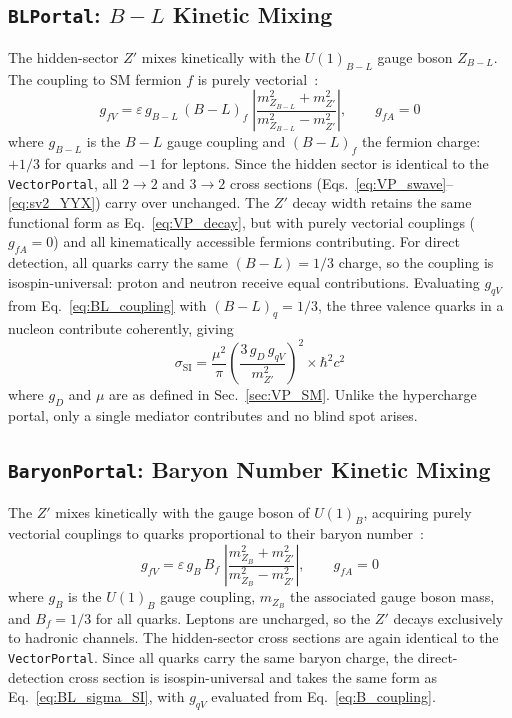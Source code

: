\documentclass[11pt]{article}
\numberwithin{equation}{section}
\newcommand{\epsX}{\varepsilon}
\begin{document}
\subsection{\texttt{BLPortal}: $B-L$ Kinetic Mixing}
\label{sec:BL}

The hidden-sector $Z'$ mixes kinetically with the $U(1)_{B-L}$ gauge boson $Z_{B-L}$. The coupling to SM fermion $f$ is purely vectorial~\cite{Hooper:2019xss}:
\begin{equation}
    g_{fV} = \epsX\,g_{B-L}\,(B-L)_f\;\left|\frac{m_{Z_{B-L}}^2 + m_{Z'}^2}{m_{Z_{B-L}}^2 - m_{Z'}^2}\right|, \qquad g_{fA} = 0
    \label{eq:BL_coupling}
\end{equation}
where $g_{B-L}$ is the $B-L$ gauge coupling and $(B-L)_f$ the fermion charge: $+1/3$ for quarks and $-1$ for leptons. Since the hidden sector is identical to the \texttt{VectorPortal}, all $2\to2$ and $3\to2$ cross sections (Eqs.~\eqref{eq:VP_swave}--\eqref{eq:sv2_YYX}) carry over unchanged. The $Z'$ decay width retains the same functional form as Eq.~\eqref{eq:VP_decay}, but with purely vectorial couplings ($g_{fA} = 0$) and all kinematically accessible fermions contributing. For direct detection, all quarks carry the same $(B-L) = 1/3$ charge, so the coupling is isospin-universal: proton and neutron receive equal contributions. Evaluating $g_{qV}$ from Eq.~\eqref{eq:BL_coupling} with $(B-L)_q = 1/3$, the three valence quarks in a nucleon contribute coherently, giving
\begin{equation}
    \sigma_{\text{SI}} = \frac{\mu^2}{\pi}\left(\frac{3\,g_D\,g_{qV}}{m_{Z'}^2}\right)^2 \times \hbar^2 c^2
    \label{eq:BL_sigma_SI}
\end{equation}
where $g_D$ and $\mu$ are as defined in Sec.~\ref{sec:VP_SM}. Unlike the hypercharge portal, only a single mediator contributes and no blind spot arises.

\subsection{\texttt{BaryonPortal}: Baryon Number Kinetic Mixing}
\label{sec:Baryon}

The $Z'$ mixes kinetically with the gauge boson of $U(1)_B$, acquiring purely vectorial couplings to quarks proportional to their baryon number~\cite{Hooper:2019xss}:
\begin{equation}
    g_{fV} = \epsX\,g_B\,B_f\;\left|\frac{m_{Z_B}^2 + m_{Z'}^2}{m_{Z_B}^2 - m_{Z'}^2}\right|, \qquad g_{fA} = 0
    \label{eq:B_coupling}
\end{equation}
where $g_B$ is the $U(1)_B$ gauge coupling, $m_{Z_B}$ the associated gauge boson mass, and $B_f = 1/3$ for all quarks. Leptons are uncharged, so the $Z'$ decays exclusively to hadronic channels. The hidden-sector cross sections are again identical to the \texttt{VectorPortal}. Since all quarks carry the same baryon charge, the direct-detection cross section is isospin-universal and takes the same form as Eq.~\eqref{eq:BL_sigma_SI}, with $g_{qV}$ evaluated from Eq.~\eqref{eq:B_coupling}.
\end{document}
